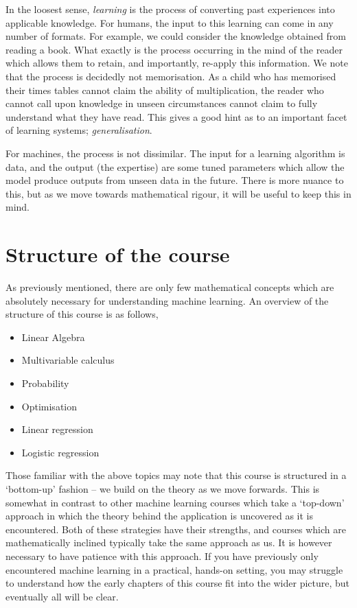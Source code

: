 In the loosest sense, \textit{learning} is the process of converting past experiences into applicable knowledge. For humans, the input to this learning can come in any number of formats. For example, we could consider the knowledge obtained from reading a book. What exactly is the process occurring in the mind of the reader which allows them to retain, and importantly, re-apply this information. We note that the process is decidedly not memorisation. As a child who has memorised their times tables cannot claim the ability of multiplication, the reader who cannot call upon knowledge in unseen circumstances cannot claim to fully understand what they have read. This gives a good hint as to an important facet of learning systems; \textit{generalisation}.

For machines, the process is not dissimilar. The input for a learning algorithm is data, and the output (the expertise) are some tuned parameters which allow the model produce outputs from unseen data in the future. There is more nuance to this, but as we move towards mathematical rigour, it will be useful to keep this in mind.

\section{Structure of the course}
As previously mentioned, there are only few mathematical concepts which are absolutely necessary for understanding machine learning. An overview of the structure of this course is as follows,

\begin{itemize}
	\item Linear Algebra
	\item Multivariable calculus
	\item Probability
	\item Optimisation
	\item Linear regression
	\item Logistic regression
\end{itemize}

Those familiar with the above topics may note that this course is structured in a `bottom-up' fashion -- we build on the theory as we move forwards. This is somewhat in contrast to other machine learning courses which take a `top-down' approach in which the theory behind the application is uncovered as it is encountered. Both of these strategies have their strengths, and courses which are mathematically inclined typically take the same approach as us. It is however necessary to have patience with this approach. If you have previously only encountered machine learning in a practical, hands-on setting, you may struggle to understand how the early chapters of this course fit into the wider picture, but eventually all will be clear.
